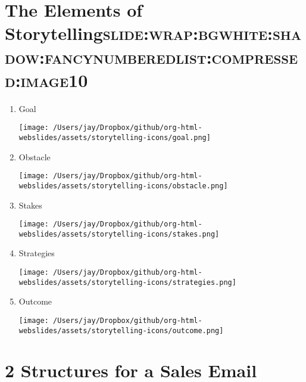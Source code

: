 \documentclass[12pt]{article}
\begin{document}
\section[The \textbf{Elements} of \textbf{Storytelling}]{The \textbf{Elements} of \textbf{Storytelling}\hfill{}\textsc{slide:wrap:bgwhite:shadow:fancynumberedlist:compressed:image10}}
\label{sec:org90a9f05}
\begin{enumerate}
\item Goal \begin{center}
\texttt{[image: /Users/jay/Dropbox/github/org-html-webslides/assets/storytelling-icons/goal.png]}
\end{center}
\item Obstacle \begin{center}
\texttt{[image: /Users/jay/Dropbox/github/org-html-webslides/assets/storytelling-icons/obstacle.png]}
\end{center}
\item Stakes \begin{center}
\texttt{[image: /Users/jay/Dropbox/github/org-html-webslides/assets/storytelling-icons/stakes.png]}
\end{center}
\item Strategies \begin{center}
\texttt{[image: /Users/jay/Dropbox/github/org-html-webslides/assets/storytelling-icons/strategies.png]}
\end{center}
\item Outcome \begin{center}
\texttt{[image: /Users/jay/Dropbox/github/org-html-webslides/assets/storytelling-icons/outcome.png]}
\end{center}
\end{enumerate}

\section{\textbf{2 Structures} for a Sales Email}
\label{sec:org384ee6f}
\end{document}
